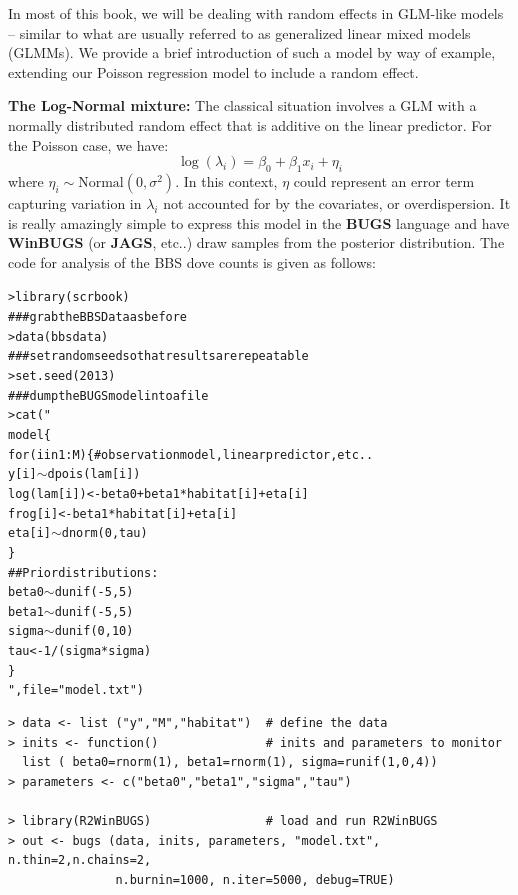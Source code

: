 In most of this book, we will be dealing with random
effects in GLM-like models -- similar to what
are usually referred to as generalized
linear mixed models (GLMMs). We provide a brief introduction of such a
model by way of
example, extending our Poisson regression model to include a random effect.


{\bf The Log-Normal mixture:} The classical situation involves a GLM
with a normally distributed random effect that is additive on the
linear predictor. For the Poisson case, we have:
\[
 	\log(\lambda_{i}) = \beta_0  + \beta_1 x_{i} + \eta_{i}
\]
where $\eta_{i} \sim \mbox{Normal}(0,\sigma^{2})$. In this context, $\eta$ could represent an error term capturing variation in $\lambda_{i}$ not accounted for by the covariates, or overdispersion. 
It is really amazingly simple to
express this model in the {\bf BUGS} language and have {\bf WinBUGS}
(or {\bf JAGS}, etc..) draw
samples from the posterior distribution. The code for analysis of the
BBS dove counts is given as follows:
{\small
\begin{alltt}
> library(scrbook)
### grab the BBS Data as before
> data(bbsdata)
### set random seed so that results are repeatable
> set.seed(2013)
### dump the BUGS model into a file
> cat("
model\{
  for (i in 1:M)\{   # observation model, linear predictor, etc..
     y[i] \(\sim\) dpois(lam[i])
     log(lam[i]) <- beta0+ beta1*habitat[i] + eta[i]
     frog[i] <- beta1*habitat[i] + eta[i]
     eta[i] \(\sim\) dnorm(0,tau)
   \}
 ## Prior distributions:
 beta0 \(\sim\) dunif(-5,5)
 beta1 \(\sim\) dunif(-5,5)
 sigma \(\sim\) dunif(0,10)
 tau <- 1/(sigma*sigma)
\}
",file="model.txt")
\end{alltt}
}
{\small
\begin{verbatim}
> data <- list ("y","M","habitat")  # define the data 
> inits <- function()               # inits and parameters to monitor
  list ( beta0=rnorm(1), beta1=rnorm(1), sigma=runif(1,0,4))
> parameters <- c("beta0","beta1","sigma","tau")

> library(R2WinBUGS)                # load and run R2WinBUGS 
> out <- bugs (data, inits, parameters, "model.txt", n.thin=2,n.chains=2,
               n.burnin=1000, n.iter=5000, debug=TRUE)
\end{verbatim}
}

